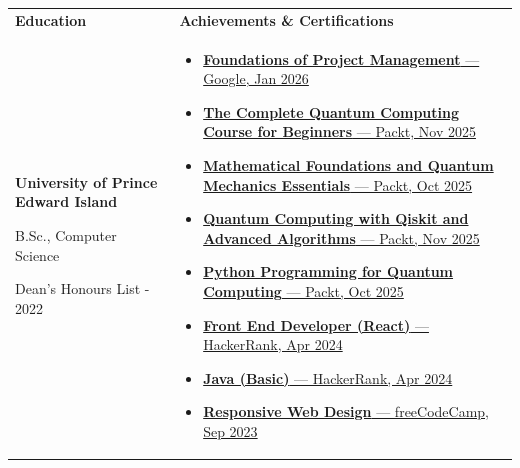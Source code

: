 \documentclass[a4paper,10pt]{article}
\begin{document}
\noindent
\begin{tabularx}{\textwidth}{@{}>{\raggedright\arraybackslash}X >{\raggedright\arraybackslash}X@{}}
\textbf{Education} & \textbf{Achievements \& Certifications} \\
\addlinespace[4pt]

\textbf{University of Prince Edward Island} \par
B.Sc., Computer Science \par
Dean's Honours List - 2022
&
\begin{itemize}[leftmargin=1.2em, itemsep=2pt, topsep=2pt]
  \item \href{https://www.coursera.org/account/accomplishments/verify/A3JHFH1FVXWV?utm_product=course}{\textbf{Foundations of Project Management} --- Google, Jan 2026}
  \item \href{https://www.coursera.org/account/accomplishments/specialization/M87NEH7GKWOU}{\textbf{The Complete Quantum Computing Course for Beginners} --- Packt, Nov 2025}
  \item \href{https://www.coursera.org/account/accomplishments/verify/UUQLY52S2333}{\textbf{Mathematical Foundations and Quantum Mechanics Essentials} --- Packt, Oct 2025}
  \item \href{https://www.coursera.org/account/accomplishments/certificate/LZGAIKEZ97JI}{\textbf{Quantum Computing with Qiskit and Advanced Algorithms} --- Packt, Nov 2025}
  \item \href{https://www.coursera.org/account/accomplishments/records/JRF854Y0WN9L}{\textbf{Python Programming for Quantum Computing} --- Packt, Oct 2025}
  \item \href{https://www.hackerrank.com/certificates/f8b56b795e5d}{\textbf{Front End Developer (React)} --- HackerRank, Apr 2024}
  \item \href{https://www.hackerrank.com/certificates/405bd17789bc}{\textbf{Java (Basic)} --- HackerRank, Apr 2024}
  \item \href{https://freecodecamp.org/certification/prabeshkunwar12/responsive-web-design}{\textbf{Responsive Web Design} --- freeCodeCamp, Sep 2023}
\end{itemize}
\end{tabularx}
\end{document}
